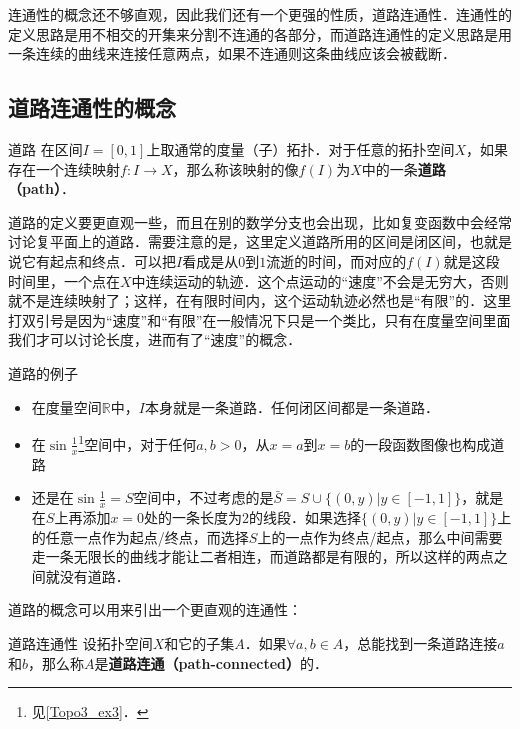 连通性的概念还不够直观，因此我们还有一个更强的性质，道路连通性．连通性的定义思路是用不相交的开集来分割不连通的各部分，而道路连通性的定义思路是用一条连续的曲线来连接任意两点，如果不连通则这条曲线应该会被截断．

\subsection{道路连通性的概念}
\begin{definition}{道路}\label{Topo4_def1}
在区间$I=[0,1]$上取通常的度量（子）拓扑．对于任意的拓扑空间$X$，如果存在一个连续映射$f: I\rightarrow X$，那么称该映射的像$f(I)$为$X$中的一条\textbf{道路（path）}．
\end{definition}

道路的定义要更直观一些，而且在别的数学分支也会出现，比如复变函数中会经常讨论复平面上的道路．需要注意的是，这里定义道路所用的区间是闭区间，也就是说它有起点和终点．可以把$I$看成是从$0$到$1$流逝的时间，而对应的$f(I)$就是这段时间里，一个点在$X$中连续运动的轨迹．这个点运动的“速度”不会是无穷大，否则就不是连续映射了；这样，在有限时间内，这个运动轨迹必然也是“有限”的．这里打双引号是因为“速度”和“有限”在一般情况下只是一个类比，只有在度量空间里面我们才可以讨论长度，进而有了“速度”的概念．

\begin{example}{道路的例子}\label{Topo4_ex1}
\begin{itemize}
\item 在度量空间$\mathbb{R}$中，$I$本身就是一条道路．任何闭区间都是一条道路．
\item 在$\sin{\frac{1}{x}}$\footnote{见\autoref{Topo3_ex3}．}空间中，对于任何$a, b>0$，从$x=a$到$x=b$的一段函数图像也构成道路
\item 还是在$\sin{\frac{1}{x}}=S$空间中，不过考虑的是$\bar{S}=S\cup\{(0, y)|y\in [-1,1]\}$，就是在$S$上再添加$x=0$处的一条长度为$2$的线段．如果选择$\{(0, y)|y\in [-1,1]\}$上的任意一点作为起点/终点，而选择$S$上的一点作为终点/起点，那么中间需要走一条无限长的曲线才能让二者相连，而道路都是有限的，所以这样的两点之间就没有道路．

\end{itemize}
\end{example}

道路的概念可以用来引出一个更直观的连通性：

\begin{definition}{道路连通性}\label{Topo4_def2}
设拓扑空间$X$和它的子集$A$．如果$\forall a, b\in A$，总能找到一条道路连接$a$和$b$，那么称$A$是\textbf{道路连通（path-connected）}的．
\end{definition}

